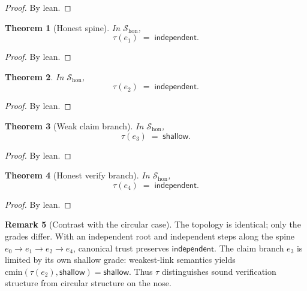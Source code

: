 \documentclass[11pt,a4paper]{article}
\theoremstyle{plain}
\newtheorem{theorem}{Theorem}[section]
\theoremstyle{definition}
\newtheorem{remark}[theorem]{Remark}
\newcommand{\cmin}{\mathrm{cmin}}
\newcommand{\tauu}{\tau}
\begin{document}
\begin{proof}
By lean.
\end{proof}

\begin{theorem}[Honest spine]\label{thm:hon-e1}
In $\mathcal{S}_{\mathrm{hon}}$,
\begin{equation}
  \tauu(e_1) \;=\; \mathsf{independent}.
\end{equation}
\end{theorem}

\begin{proof}
By lean.
\end{proof}

\begin{theorem}\label{thm:hon-e2}
In $\mathcal{S}_{\mathrm{hon}}$,
\begin{equation}
  \tauu(e_2) \;=\; \mathsf{independent}.
\end{equation}
\end{theorem}

\begin{proof}
By lean.
\end{proof}

\begin{theorem}[Weak claim branch]\label{thm:hon-e3}
In $\mathcal{S}_{\mathrm{hon}}$,
\begin{equation}
  \tauu(e_3) \;=\; \mathsf{shallow}.
\end{equation}
\end{theorem}

\begin{proof}
By lean.
\end{proof}

\begin{theorem}[Honest verify branch]\label{thm:hon-e4}
In $\mathcal{S}_{\mathrm{hon}}$,
\begin{equation}
  \tauu(e_4) \;=\; \mathsf{independent}.
\end{equation}
\end{theorem}

\begin{proof}
By lean.
\end{proof}

\begin{remark}[Contrast with the circular case]
The topology is identical; only the grades differ. With an independent root
and independent steps along the spine $e_0 \to e_1 \to e_2 \to e_4$,
canonical trust preserves $\mathsf{independent}$. The claim branch $e_3$ is
limited by its own shallow grade: weakest-link semantics yields
$\cmin(\tauu(e_2), \mathsf{shallow}) = \mathsf{shallow}$. Thus $\tauu$
distinguishes sound verification structure from circular structure on the
nose.
\end{remark}
\end{document}
